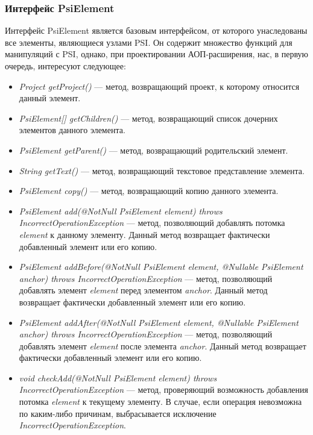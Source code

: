 \subsubsection{Интерфейс PsiElement}
\label{ssub:psi_element_description}
Интерфейс PsiElement является базовым интерфейсом, от которого унаследованы все
элементы, являющиеся узлами PSI.
Он содержит множество функций для манипуляций с PSI, однако, при проектировании
АОП-расширения, нас, в первую очередь, интересуют следующее:
\begin{itemize}
	\item \textit{Project getProject()} --- метод, возвращающий проект, к
		которому относится данный элемент.
	\item \textit{PsiElement[] getChildren()} --- метод, возвращающий список
		дочерних элементов данного элемента.
	\item \textit{PsiElement getParent()} --- метод, возвращающий родительский
		элемент.
	\item \textit{String getText()} --- метод, возвращающий текстовое
		представление элемента.
	\item \textit{PsiElement copy()} --- метод, возвращающий копию данного
		элемента.
	\item \textit{PsiElement add(@NotNull PsiElement element) throws
		IncorrectOperationException} --- метод, позволяющий добавлять потомка
		\textit{element} к данному элементу.
		Данный метод возвращает фактически добавленный элемент или его копию.
	\item \textit{PsiElement addBefore(@NotNull PsiElement element, @Nullable
		PsiElement anchor) throws IncorrectOperationException} --- метод,
		позволяющий добавлять элемент \textit{element} перед элементом
		\textit{anchor}.
		Данный метод возвращает фактически добавленный элемент или его копию.
	\item \textit{PsiElement addAfter(@NotNull PsiElement element, @Nullable
		PsiElement anchor) throws IncorrectOperationException} --- метод,
		позволяющий добавлять элемент \textit{element} после элемента
		\textit{anchor}.
		Данный метод возвращает фактически добавленный элемент или его копию.
	\item \textit{void checkAdd(@NotNull PsiElement element) throws
		IncorrectOperationException} --- метод, проверяющий возможность
		добавления потомка \textit{element} к текущему элементу.
		В случае, если операция невозможна по каким-либо причинам, выбрасывается
		исключение \textit{IncorrectOperationException}.

\end{itemize}
